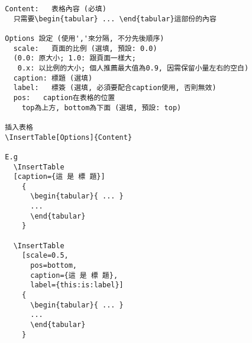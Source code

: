   \EmptyLine
  \begin{fmpage}{\textwidth}
  \begin{verbatim}
  Content:   表格內容 (必填)
    只需要\begin{tabular} ... \end{tabular}這部份的內容

  Options 設定 (使用','來分隔, 不分先後順序)
    scale:   頁面的比例 (選填, 預設: 0.0)
    (0.0: 原大小; 1.0: 跟頁面一樣大;
     0.x: 以比例的大小; 個人推薦最大值為0.9, 因需保留小量左右的空白)
    caption: 標題 (選填)
    label:   標簽 (選填, 必須要配合caption使用, 否則無效)
    pos:   caption在表格的位置
      top為上方, bottom為下面 (選填, 預設: top)

  插入表格
  \InsertTable[Options]{Content}

  E.g
    \InsertTable
    [caption={這 是 標 題}]
      {
        \begin{tabular}{ ... }
        ...
        \end{tabular}
      }

    \InsertTable
      [scale=0.5,
        pos=bottom,
        caption={這 是 標 題},
        label={this:is:label}]
      {
        \begin{tabular}{ ... }
        ...
        \end{tabular}
      }
  \end{verbatim}
  \end{fmpage}


